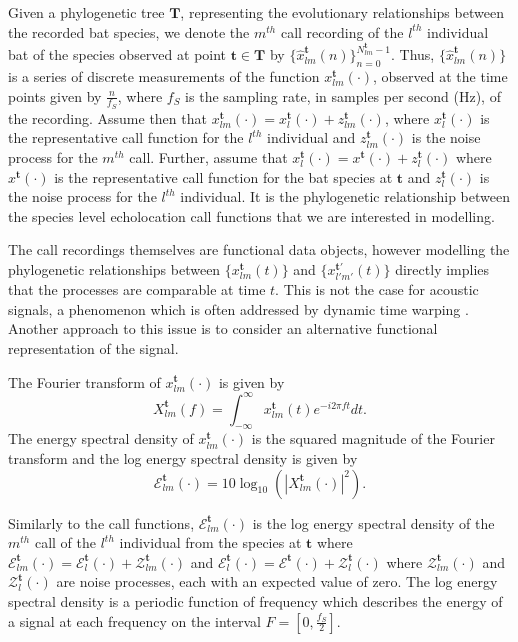 \documentclass{ws-rv9x6}
\begin{document}
Given a phylogenetic tree \(\mathbf{T}\), representing the evolutionary relationships between the recorded bat species, we denote the \(m^{th}\) call recording of the \(l^{th}\) individual bat of the species observed at point \(\mathbf{t} \in \mathbf{T}\) by \(\{\hat{x}_{lm}^{\mathbf{t}}(n)\}_{n=0}^{N_{lm}^{\mathbf{t}} - 1}\). 
Thus, \(\{\hat{x}_{lm}^{\mathbf{t}}(n)\}\) is a series of discrete measurements of the function \(x_{lm}^{\mathbf{t}}(\cdot)\), observed at the time points given by \(\frac{n}{f_S}\), where \(f_S\) is the sampling rate, in samples per second (Hz), of the recording. Assume then that \(x_{lm}^{\mathbf{t}}(\cdot) = x_{l}^{\mathbf{t}}(\cdot) + z_{lm}^{\mathbf{t}}(\cdot)\), where \(x_{l}^{\mathbf{t}}(\cdot)\) is the representative call function for the \(l^{th}\) individual and \(z_{lm}^{\mathbf{t}}(\cdot)\) is the noise process for the \(m^{th}\) call. Further, assume that \(x_{l}^{\mathbf{t}}(\cdot) = x^{\mathbf{t}}(\cdot) + z_{l}^{\mathbf{t}}(\cdot)\) where \(x^{\mathbf{t}}(\cdot)\) is the representative call function for the bat species at \({\mathbf{t}}\) and \(z_{l}^{\mathbf{t}}(\cdot)\) is the noise process for the \(l^{th}\) individual. It is the phylogenetic relationship between the species level echolocation call functions that we are interested in modelling.

The call recordings themselves are functional data objects, however modelling the phylogenetic relationships between \(\{x_{lm}^{\mathbf{t}}(t)\}\) and \(\{x_{l'm'}^{{\mathbf{t}}'}(t)\}\) directly implies that the processes are comparable at time \(t\). 
This is not the case for acoustic signals, a phenomenon which is often addressed by dynamic time warping \cite{berndt1994using}. Another approach to this issue is to consider an alternative functional representation of the signal. 

The Fourier transform of \(x_{lm}^{\mathbf{t}}(\cdot)\) is given by
\[
X_{lm}^{\mathbf{t}}(f) = \int_{-\infty}^{\infty} x_{lm}^{\mathbf{t}}(t) e^{-i 2\pi f t} dt.
\label{eqn:dft}
\]
The energy spectral density of \(x_{lm}^{\mathbf{t}}(\cdot)\) is the squared magnitude of the Fourier transform and the log energy spectral density is given by
\[
\mathcal{E}_{lm}^{\mathbf{t}}(\cdot) = 10 \log_{10} \left( |X_{lm}^{\mathbf{t}}(\cdot)|^2 \right).
\]

Similarly to the call functions, \(\mathcal{E}_{lm}^{\mathbf{t}}(\cdot)\) is the log energy spectral density of the \(m^{th}\) call of the \(l^{th}\) individual from the species at \({\mathbf{t}}\) where \(\mathcal{E}_{lm}^{\mathbf{t}}(\cdot) = \mathcal{E}_{l}^{\mathbf{t}}(\cdot) + \mathcal{Z}_{lm}^{\mathbf{t}}(\cdot)\) and \(\mathcal{E}_{l}^{\mathbf{t}}(\cdot) = \mathcal{E}^{\mathbf{t}}(\cdot) + \mathcal{Z}_{l}^{\mathbf{t}}(\cdot)\) where \(\mathcal{Z}_{lm}^{\mathbf{t}}(\cdot)\) and \(\mathcal{Z}_{l}^{\mathbf{t}}(\cdot)\) are noise processes, each with an expected value of zero.  The log energy spectral density is a periodic function of frequency which describes the energy of a signal at each frequency on the interval \(F = [0, \frac{f_S}{2}]\).\cite{antoniou2006digital}
\end{document}
